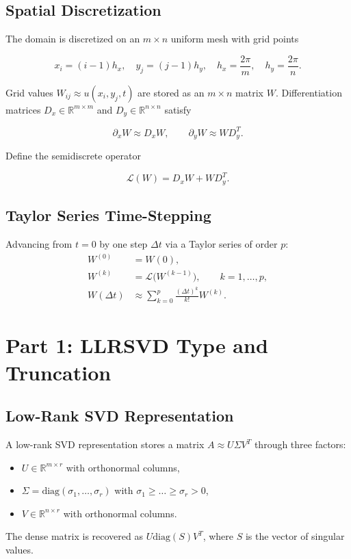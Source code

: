 \documentclass[11pt]{report}
\begin{document}
\subsection{Spatial Discretization}

The domain is discretized on an \(m \times n\) uniform mesh with grid points


\[
x_i = (i-1)h_x,\quad y_j = (j-1)h_y,\quad h_x = \frac{2\pi}{m},\quad h_y = \frac{2\pi}{n}.
\]


Grid values \(W_{ij} \approx u(x_i,y_j,t)\) are stored as an \(m \times n\) matrix \(W\).
Differentiation matrices \(D_x \in \mathbb{R}^{m \times m}\) and \(D_y \in \mathbb{R}^{n \times n}\) satisfy


\[
\partial_x W \approx D_x W,\qquad \partial_y W \approx W D_y^T.
\]


Define the semidiscrete operator


\[
\mathcal{L}(W) = D_x W + W D_y^T.
\]



\subsection{Taylor Series Time-Stepping}

Advancing from \(t=0\) by one step \(\Delta t\) via a Taylor series of order \(p\):
\begin{align}
    W^{(0)} &= W(0),\\
    W^{(k)} &= \mathcal{L}\big(W^{(k-1)}\big),\qquad k=1,\dots,p,\\
    W(\Delta t) &\approx \sum_{k=0}^{p} \frac{(\Delta t)^k}{k!} W^{(k)}.
\end{align}

\section{Part 1: LLRSVD Type and Truncation}

\subsection{Low-Rank SVD Representation}

A low-rank SVD representation stores a matrix \(A \approx U \Sigma V^T\) through three factors:
\begin{itemize}[leftmargin=*]
    \item \(U \in \mathbb{R}^{m \times r}\) with orthonormal columns,
    \item \(\Sigma = \mathrm{diag}(\sigma_1,\dots,\sigma_r)\) with \(\sigma_1 \ge \dots \ge \sigma_r > 0\),
    \item \(V \in \mathbb{R}^{n \times r}\) with orthonormal columns.
\end{itemize}
The dense matrix is recovered as \(U \mathrm{diag}(S) V^T\), where \(S\) is the vector of singular values.
\end{document}
